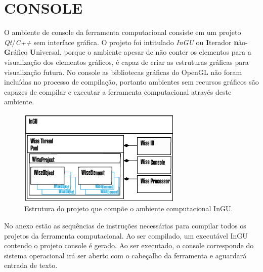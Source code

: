 \section{CONSOLE}\label{sec:console}

O ambiente de console da ferramenta computacional consiste em um projeto \textit{Qt}/\textit{C++} sem interface gráfica. O projeto foi intitulado \textit{InGU} ou \textbf{I}terador \textbf{n}ão-\textbf{G}ráfico \textbf{U}niversal, porque o ambiente apesar de não conter os elementos para a visualização dos elementos gráficos, é capaz de criar as estruturas gráficas para visualização futura.  No console as bibliotecas gráficas do OpenGL não foram incluídas no processo de compilação, portanto ambientes sem recursos gráficos são capazes de compilar e executar a ferramenta computacional através deste ambiente.

\begin{figure}[!htbp]
	\centering
	\includegraphics[width=\linewidth]{Figures/InGU.png}
	\caption{Estrutura do projeto que compõe o ambiente computacional InGU.}
	\label{fig10:console}
\end{figure}

No anexo estão as sequências de instruções necessárias para compilar todos os projetos da ferramenta computacional. Ao ser compilado, um executável InGU contendo o projeto console é gerado. Ao ser executado, o console corresponde do sistema operacional irá ser aberto com o cabeçalho da ferramenta e aguardará entrada de texto.

